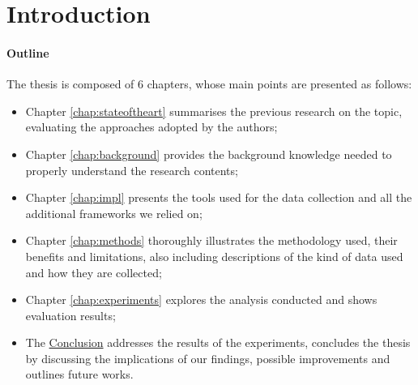 \chapter{Introduction}
\label{chap:intro}



\lipsum


\subsubsection*{Outline}
\label{subsec:outline}

The thesis is composed of 6 chapters, whose main points are presented as follows:
\begin{itemize}
	\item Chapter \ref{chap:stateoftheart} summarises the previous research 
	on the topic, evaluating the approaches adopted by the authors;
	
	\item Chapter \ref{chap:background} provides the background knowledge 
	needed to properly understand the research contents;
	
	\item Chapter \ref{chap:impl} presents the tools used for the data collection 
	and all the additional frameworks we relied on;
		
	\item Chapter \ref{chap:methods} thoroughly illustrates the methodology used, 
	their benefits and limitations, also including descriptions of the kind of data 
	used and how they are collected;

	\item Chapter \ref{chap:experiments} explores the analysis conducted and 
	shows evaluation results;	
	
	\item The \hyperref[chap:concl]{Conclusion} addresses the results of the 
	experiments, concludes the thesis by discussing the implications of our findings, 
	possible improvements and outlines future works.
\end{itemize}





